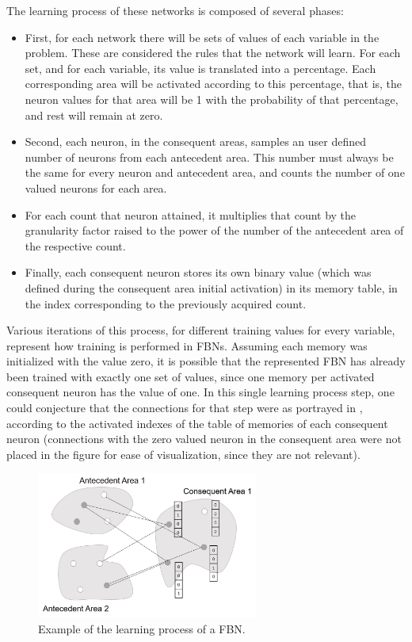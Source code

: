 The learning process of these networks is composed of several phases:
\begin{itemize}
\item First, for each network there will be sets of values of each variable in the problem. These are considered the rules that the network will learn. For each set, and for each variable, its value is translated into a percentage. Each corresponding area will be activated according to this percentage, that is, the neuron values for that area will be 1 with the probability of that percentage, and rest will remain at zero.
\item Second, each neuron, in the consequent areas, samples an user defined number of neurons from each antecedent area. This number must always be the same for every neuron and antecedent area, and counts the number of one valued neurons for each area. 
\item For each count that neuron attained, it multiplies that count by the granularity factor raised to the power of the number of the antecedent area of the respective count.
\item Finally, each consequent neuron stores its own binary value (which was defined during the consequent area initial activation) in its memory table, in the index corresponding to the previously acquired count.
\end{itemize}

Various iterations of this process, for different training values for every variable,  represent how training is performed in FBNs.
Assuming each memory was initialized with the value zero, it is possible that the represented FBN has already been trained with exactly one set of values, since one memory per activated consequent neuron has the value of one. In this single learning process step, one could conjecture that the connections for that step were as portrayed in , according to the activated indexes of the table of memories of each consequent neuron (connections with the zero valued neuron in the consequent area were not placed in the figure for ease of visualization, since they are not relevant).

\begin{figure}[ht]
\centering
\includegraphics[width=0.65\textwidth]{./Images/fbn-drawing-2.jpg}
\caption{Example of the learning process of a FBN.}
\label{fig:fbn-drawing-2}
\end{figure}

